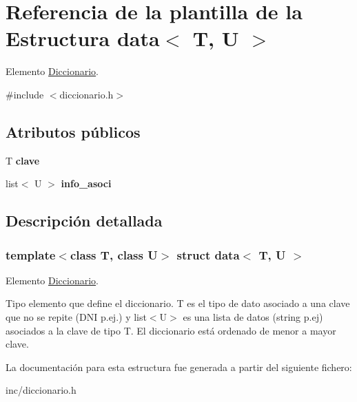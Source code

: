 \hypertarget{structdata}{}\section{Referencia de la plantilla de la Estructura data$<$ T, U $>$}
\label{structdata}


Elemento \hyperlink{classDiccionario}{Diccionario}.  




{\ttfamily \#include $<$diccionario.\+h$>$}

\subsection*{Atributos públicos}
\begin{DoxyCompactItemize}
\item 
\mbox{\label{structdata_aa3298b9b021e026f8663005d2fc19e1a}} 
T {\bfseries clave}
\item 
\mbox{\label{structdata_a8299bf6975cfaffbb2354a65881e16a2}} 
list$<$ U $>$ {\bfseries info\+\_\+asoci}
\end{DoxyCompactItemize}


\subsection{Descripción detallada}
\subsubsection*{template$<$class T, class U$>$\newline
struct data$<$ T, U $>$}

Elemento \hyperlink{classDiccionario}{Diccionario}. 

Tipo elemento que define el diccionario. T es el tipo de dato asociado a una clave que no se repite (D\+NI p.\+ej.) y list$<$\+U$>$ es una lista de datos (string p.\+ej) asociados a la clave de tipo T. El diccionario está ordenado de menor a mayor clave. 

La documentación para esta estructura fue generada a partir del siguiente fichero\+:\begin{DoxyCompactItemize}
\item 
inc/diccionario.\+h\end{DoxyCompactItemize}
